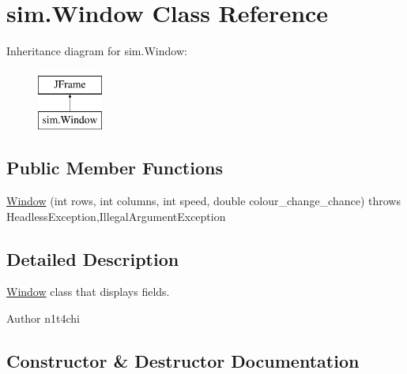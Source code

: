 \hypertarget{classsim_1_1_window}{}\section{sim.\+Window Class Reference}
\label{classsim_1_1_window}
Inheritance diagram for sim.\+Window\+:\begin{figure}[H]
\begin{center}
\leavevmode
\includegraphics[height=2.000000cm]{classsim_1_1_window}
\end{center}
\end{figure}
\subsection*{Public Member Functions}
\begin{DoxyCompactItemize}
\item 
\hyperlink{classsim_1_1_window_ac192bb42f8dadb908135fec3ea5076ce}{Window} (int rows, int columns, int speed, double colour\+\_\+change\+\_\+chance)  throws Headless\+Exception,\+Illegal\+Argument\+Exception 
\end{DoxyCompactItemize}


\subsection{Detailed Description}
\hyperlink{classsim_1_1_window}{Window} class that displays fields. \begin{DoxyAuthor}{Author}
n1t4chi 
\end{DoxyAuthor}


\subsection{Constructor \& Destructor Documentation}
